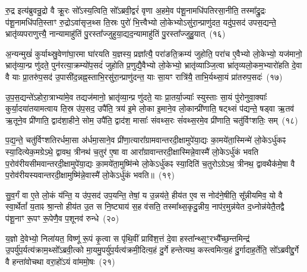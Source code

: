 रु॒द्र इत्य॑ब्रुवन्रु॒द्रो वै क्रू॒रः सो᳚\-ऽस्य॒त्विति॒ सो᳚\-ऽब्रवी॒द्वरं॑ वृणा अ॒हमे॒व प॑शू॒नामधि॑\-पतिरसा॒नीति॒ तस्मा᳚द्रु॒द्रः प॑शू॒नामधि॑\-पति॒स्ताꣳ रु॒द्रो\-ऽवा॑सृज॒थ्स ति॒स्रः पुरो॑ भि॒त्त्वैभ्यो लो॒केभ्यो\-ऽसु॑रा॒न्प्राणु॑दत॒ यदु॑प॒सद॑ उपस॒द्यन्ते॒ भ्रातृ॑व्यपराणुत्त्यै॒ नान्यामाहु॑तिं पु॒रस्ता᳚ज्जुहुया॒द्यद॒न्यामाहु॑तिं पु॒रस्ता᳚ज्जुहु॒यात्~(१६)

अ॒न्यन्मुखं॑ कुर्याथ्स्रु॒वेणा॑घा॒रमा घा॑रयति य॒ज्ञस्य॒ प्रज्ञा᳚त्यै॒ परा॑ङति॒क्रम्य॑ जुहोति॒ परा॑च ए॒वैभ्यो लो॒केभ्यो॒ यज॑मानो॒ भ्रातृ॑व्या॒न्प्र णु॑दते॒ पुन॑रत्या॒क्रम्यो॑प॒सदं॑ जुहोति प्र॒णुद्यै॒वैभ्यो लो॒केभ्यो॒ भ्रातृ॑व्याञ्जि॒त्वा भ्रा॑तृव्यलो॒कम॒भ्यारो॑हति दे॒वा वै याः प्रा॒तरु॑प॒सद॑ उ॒पासी॑द॒न्नह्न॒स्ताभि॒रसु॑रा॒न्प्राणु॑दन्त॒ याः सा॒यꣳ रात्रि॑यै॒ ताभि॒र्यथ्सा॒यं प्रा॑तरुप॒सदः॑~(१७)

उ॒प॒स॒द्यन्ते॑\-ऽहोरा॒त्राभ्या॑मे॒व तद्यज॑मानो॒ भ्रातृ॑व्या॒न्प्र णु॑दते॒ याः प्रा॒तर्या॒ज्याः᳚ स्युस्ताः सा॒यं पु॑रोनुवा॒क्याः᳚ कुर्या॒दया॑तयामत्वाय ति॒स्र उ॑प॒सद॒ उपै॑ति॒ त्रय॑ इ॒मे लो॒का इ॒माने॒व लो॒कान्प्री॑णाति॒ षट्थ्सं प॑द्यन्ते॒ षड्वा ऋ॒तव॑ ऋ॒तूने॒व प्री॑णाति॒ द्वाद॑शा॒हीने॒ सोम॒ उपै॑ति॒ द्वाद॑श॒ मासाः᳚ संवथ्स॒रः सं॑वथ्स॒रमे॒व प्री॑णाति॒ चतु॑र्विꣳशतिः॒ सम्~(१८)

प॒द्य॒न्ते॒ चतु॑र्विꣳशतिरर्धमा॒सा अ॑र्धमा॒साने॒व प्री॑णा॒त्यारा᳚ग्रामवान्तरदी॒क्षामुपे॑या॒द्यः का॒मये॑ता॒स्मिन्मे॑ लो॒के\-ऽर्धु॑कꣴ स्या॒दित्येक॒मग्रे\-ऽथे॒ द्वावथ॒ त्रीनथ॑ च॒तुर॑ ए॒षा वा आरा᳚ग्रावान्तरदी॒क्षास्मिन्ने॒वास्मै॑ लो॒के\-ऽर्धु॑कं भवति प॒रोव॑रीयसीमवान्तरदी॒क्षामुपे॑या॒द्यः का॒मये॑ता॒मुष्मि॑न्मे लो॒के\-ऽर्धु॑कꣴ स्या॒दिति॑ च॒तुरो\-ऽग्रे\-ऽथ॒ त्रीनथ॒ द्वावथैक॑मे॒षा वै प॒रोव॑रीयस्यवान्तरदी॒क्षामुष्मि॑न्ने॒वास्मै॑ लो॒के\-ऽर्धु॑कं भवति॥~(१९)

{\anuvakamend[{अ॒सि॒ष्य॒तीति॑ जुहु॒याथ्सा॒यं प्रा॑तरुप॒सद॒श्चतु॑र्विꣳशतिः॒ सञ्च॒तुरो\-ऽग्रे॒ षोड॑श च}]}%

सु॒व॒र्गं वा ए॒ते लो॒कं य॑न्ति॒ य उ॑प॒सद॑ उप॒यन्ति॒ तेषां॒ य उ॒न्नय॑ते॒ हीय॑त ए॒व स नोद॑ने॒षीति॒ सू᳚न्नीयमिव॒ यो वै स्वा॒र्थेतां᳚ य॒ताꣴ श्रा॒न्तो हीय॑त उ॒त स नि॒ष्ट्याय॑ स॒ह व॑सति॒ तस्मा᳚थ्स॒कृदु॒न्नीय॒ नाप॑र॒मुन्न॑येत द॒ध्नोन्न॑येतै॒तद्वै प॑शू॒नाꣳ रू॒पꣳ रू॒पेणै॒व प॒शूनव॑ रुन्धे~(२०)

य॒ज्ञो दे॒वेभ्यो॒ निला॑यत॒ विष्णू॑ रू॒पं कृ॒त्वा स पृ॑थि॒वीं प्रावि॑श॒त्तं दे॒वा हस्ता᳚न्थ्स॒ꣳ॒रभ्यै᳚च्छ॒न्तमिन्द्र॑ उ॒पर्यु॑प॒र्यत्य॑क्राम॒थ्सो᳚\-ऽब्रवी॒त्को मा॒यमु॒पर्यु॑प॒र्यत्य॑क्रमी॒दित्य॒हं दु॒र्गे हन्तेत्यथ॒ कस्त्वमित्य॒हं दु॒र्गादाह॒र्तेति॒ सो᳚\-ऽब्रवीद्दु॒र्गे वै हन्ता॑वोचथा वरा॒हो॑\-ऽयं वा॑ममो॒षः~(२१)

